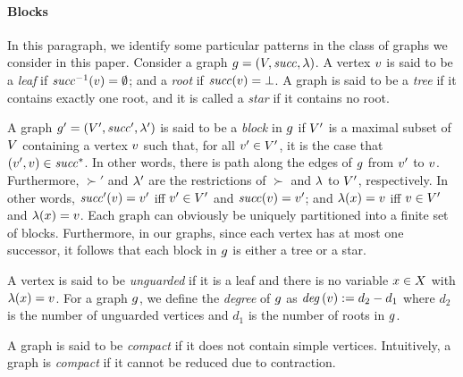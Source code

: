 \paragraph{\bf Blocks}
In this paragraph, we identify some particular patterns in the class of
graphs we consider in this paper.
%
Consider a graph $g=\left(V,{\it succ},\lambda\right)$.
%
A vertex $v$ is said to be a {\it leaf} if ${\it succ}^{-1}(v)=\emptyset$;
and a {\it root} if ${\it succ}(v)=\bot$.
%
A graph is said to be a {\it tree} if it contains exactly one root, and it
is called a {\it star} if it contains no root.

%
A graph $g'=\left(V',{\it succ}',\lambda'\right)$ is said to be a {\it block}
in $g$ if $V'$ is a maximal subset of $V$
containing a vertex $v$  such that, for all $v'\in V'$, it is the
case that $\left(v',v\right)\in{\it succ}^*$.
%
In other words, there is path along the edges of $g$ from $v'$ to $v$.
%
Furthermore,
$\succ'$ and $\lambda'$ are the restrictions of $\succ$ and $\lambda$ to
$V'$, respectively.
%
In other words, ${\it succ}'(v)=v'$ iff $v'\in V'$
and ${\it succ}(v)=v'$; and
$\lambda(x)=v$ iff
$v\in V'$ and
$\lambda(x)=v$.
%
Each graph can obviously be uniquely partitioned into a finite set
of blocks.
%
Furthermore, in our graphs, since each vertex has at most one successor, it follows that 
each block in $g$ is either a tree or a star.
%

%
A vertex is said to be {\it unguarded} if it is a leaf and there is no
variable $x\in X$ with $\lambda(x)=v$.
%
For a graph $g$,
we define the {\it degree} of $g$ as
${\it deg}\left(v\right):=d_2-d_1$ where $d_2$ is the number of unguarded vertices and
$d_1$ is the number of roots in $g$.
%

A graph is said to be {\it compact} if it does not contain simple vertices.
%
Intuitively, a graph is {\it compact} if it cannot be reduced
due to contraction.


